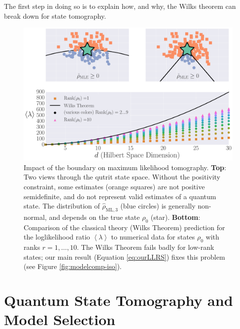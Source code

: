\documentclass[aps,pra, twocolumn]{revtex4-1}
\newcommand{\expect}[1]{\ensuremath{\left\langle#1\right\rangle}}
\newcommand{\rhohat}{\hat{\rho}}
\newcommand{\rhoML}[1]{\rhohat_{\scriptscriptstyle{\mathrm{ML},#1}}}
\begin{document}
The first step in doing so is to explain how, and why, the Wilks theorem can break down for state tomography.

\begin{figure}[h]
\includegraphics[width=\columnwidth]{Images/Figure_1.pdf}
 \caption{Impact of the boundary on maximum likelihood tomography. \textbf{Top}: Two views through the qutrit state space. Without the positivity constraint, some estimates (orange squares) are not positive semidefinite, and do not represent valid estimates of a quantum state. The distribution of $\rhoML{3}$ (blue circles) is generally non-normal, and depends on the true state $\rho_{0}$ (star).
\textbf{Bottom}:  Comparison of the classical theory (Wilks Theorem) prediction for the loglikelihood ratio $\expect{\lambda}$ to numerical data for states $\rho_{0}$ with ranks $r=1,\ldots ,10$.  The Wilks Theorem fails badly for low-rank states; our main result (Equation \ref{eq:ourLLRS}) fixes this problem (see Figure \ref{fig:modelcomp-iso}).}
\label{fig:boundaries}
\end{figure}

\section{Quantum State Tomography and Model Selection}
\end{document}
